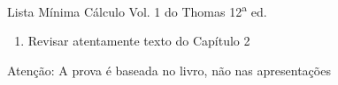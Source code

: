 \documentclass[fleqn,utf8,aspectratio=169,12pt,ignorenonframetext]{beamer}
\begin{document}
\begin{frame}{Lista Mínima}
  Cálculo Vol. 1 do Thomas 12\textsuperscript{a} ed.
  \begin{enumerate}
    \item Revisar atentamente texto do Capítulo 2
  \end{enumerate}
  \vfill
  Atenção: A prova é baseada no livro, não nas apresentações
\end{frame}

\end{document}
